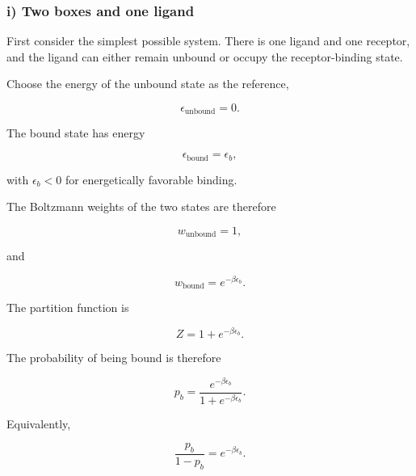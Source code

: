 \subsubsection*{i) Two boxes and one ligand}

First consider the simplest possible system.
There is one ligand and one receptor, and the ligand can either remain unbound or occupy the receptor-binding state.

Choose the energy of the unbound state as the reference,

\begin{equation}
    \epsilon_{\mathrm{unbound}}=0.
\end{equation}

The bound state has energy

\begin{equation}
    \epsilon_{\mathrm{bound}}=\epsilon_b,
\end{equation}

with $\epsilon_b<0$ for energetically favorable binding.

The Boltzmann weights of the two states are therefore

\begin{equation}
    w_{\mathrm{unbound}}=1,
\end{equation}

and

\begin{equation}
    w_{\mathrm{bound}}=e^{-\beta\epsilon_b}.
\end{equation}

The partition function is

\begin{equation}
    Z=1+e^{-\beta\epsilon_b}.
\end{equation}

The probability of being bound is therefore

\begin{equation}
    p_b=\frac{e^{-\beta\epsilon_b}}{1+e^{-\beta\epsilon_b}}.
\end{equation}

Equivalently,

\begin{equation}
    \frac{p_b}{1-p_b}=e^{-\beta\epsilon_b}.
\end{equation}


